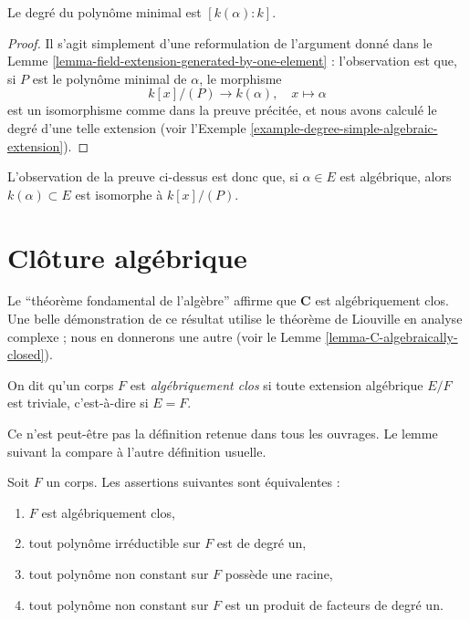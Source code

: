 \begin{lemma}
\label{lemma-degree-minimal-polynomial}
Le degré du polynôme minimal est $[k(\alpha) : k]$.
\end{lemma}

\begin{proof}
Il s'agit simplement d'une reformulation de l'argument donné dans le
Lemme \ref{lemma-field-extension-generated-by-one-element} : l'observation
est que, si $P$ est le polynôme minimal de $\alpha$, le morphisme
$$
k[x]/(P) \to k(\alpha), \quad x \mapsto \alpha
$$
est un isomorphisme comme dans la preuve précitée, et nous avons calculé le
degré d'une telle extension (voir
l'Exemple \ref{example-degree-simple-algebraic-extension}).
\end{proof}

\noindent
L'observation de la preuve ci-dessus est donc que, si $\alpha \in E$ est algébrique,
alors $k(\alpha) \subset E$ est isomorphe à $k[x]/(P)$.


\section{Clôture algébrique}
\label{section-algebraic-closure}

\noindent
Le ``théorème fondamental de l'algèbre'' affirme que $\mathbf{C}$ est
algébriquement clos. Une belle démonstration de ce résultat utilise
le théorème de Liouville en analyse complexe ; nous en donnerons une autre
(voir le Lemme \ref{lemma-C-algebraically-closed}).

\begin{definition}
\label{definition-algebraically-closed}
On dit qu'un corps $F$ est {\it algébriquement clos} si toute extension algébrique
$E/F$ est triviale, c'est-à-dire si $E = F$.
\end{definition}

\noindent
Ce n'est peut-être pas la définition retenue dans tous les ouvrages. Le lemme suivant
la compare à l'autre définition usuelle.

\begin{lemma}
\label{lemma-algebraically-closed}
Soit $F$ un corps. Les assertions suivantes sont équivalentes :
\begin{enumerate}
\item $F$ est algébriquement clos,
\item tout polynôme irréductible sur $F$ est de degré un,
\item tout polynôme non constant sur $F$ possède une racine,
\item tout polynôme non constant sur $F$ est un produit de facteurs de degré un.
\end{enumerate}
\end{lemma}

